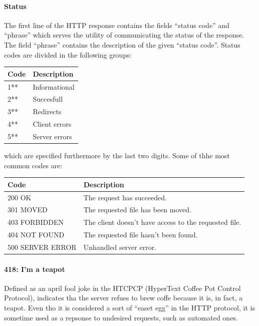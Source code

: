 \documentclass{article}
\begin{document}
\paragraph{Status}
The first line of the HTTP response contains the fields ``status code'' and ``phrase'' which serves the utility of communicating the status of the response. The field ``phrase'' contains the description of the given ``status code''. Status codes are divided in the following groups:
\begin{center}
    \begin{tabular}{l|l}
        \toprule
        \textbf{Code} & \textbf{Description} \\
        \midrule
        1**           & Informational        \\
        2**           & Succesfull           \\
        3**           & Redirects            \\
        4**           & Client errors        \\
        5**           & Server errors        \\
        \bottomrule
    \end{tabular}
\end{center}
which are specified furthermore by the last two digits. Some of thhe most common codes are:
\begin{center}
    \begin{tabular}{l|l}
        \toprule
        \textbf{Code}    & \textbf{Description}                                  \\
        \midrule
        200 OK           & The request has succeeded.                            \\
        301 MOVED        & The requested file has been moved.                    \\
        403 FORBIDDEN    & The client doesn't have access to the requested file. \\
        404 NOT FOUND    & The requested file hasn't been found.                 \\
        500 SERVER ERROR & Unhandled server error.                               \\
        \bottomrule
    \end{tabular}
\end{center}

\paragraph{418: I'm a teapot}
Defined as an april fool joke in the HTCPCP (HyperText Coffee Pot Control Protocol), indicates tha the server refues to brew coffe because it is, in fact, a teapot. Even tho it is considered a sort of ``easet egg'' in the HTTP protocol, it is sometime used as a repsonse to undesired requests, such as automated ones.
\end{document}
